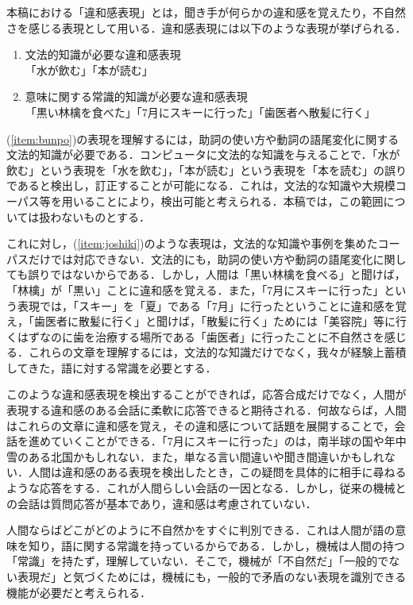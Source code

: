 \documentclass[japanese]{jnlp_1.4}
\begin{document}
本稿における「違和感表現」とは，聞き手が何らかの違和感を覚えたり，不自然さを感じる表現として用いる．違和感表現には以下のような表現が挙げられる．
	\begin{enumerate}
		\item \label{item:bunpo}  文法的知識が必要な違和感表現\\
			「水が飲む」「本が読む」
		\item \label{item:joshiki} 意味に関する常識的知識が必要な違和感表現\\
			「黒い林檎を食べた」「7月にスキーに行った」「歯医者へ散髪に行く」
	\end{enumerate} 
(\ref{item:bunpo})の表現を理解するには，助詞の使い方や動詞の語尾変化に関する文法的知識が必要である．コンピュータに文法的な知識を与えることで．「水が飲む」という表現を「水を飲む」，「本が読む」という表現を「本を読む」の誤りであると検出し，訂正することが可能になる．これは，文法的な知識や大規模コーパス等\cite{Kawahara2006}を用いることにより，検出可能と考えられる．本稿では，この範囲については扱わないものとする．

これに対し，(\ref{item:joshiki})のような表現は，文法的な知識や事例を集めたコーパスだけでは対応できない．文法的にも，助詞の使い方や動詞の語尾変化に関しても誤りではないからである．しかし，人間は「黒い林檎を食べる」と聞けば，「林檎」が「黒い」ことに違和感を覚える．また，「7月にスキーに行った」という表現では，「スキー」を「夏」である「7月」に行ったということに違和感を覚え，「歯医者に散髪に行く」と聞けば，「散髪に行く」ためには「美容院」等に行くはずなのに歯を治療する場所である「歯医者」に行ったことに不自然さを感じる．これらの文章を理解するには，文法的な知識だけでなく，我々が経験上蓄積してきた，語に対する常識を必要とする．

このような違和感表現を検出することができれば，応答合成だけでなく，人間が表現する違和感のある会話に柔軟に応答できると期待される．何故ならば，人間はこれらの文章に違和感を覚え，その違和感について話題を展開することで，会話を進めていくことができる．「7月にスキーに行った」のは，南半球の国や年中雪のある北国かもしれない．また，単なる言い間違いや聞き間違いかもしれない．人間は違和感のある表現を検出したとき，この疑問を具体的に相手に尋ねるような応答をする．これが人間らしい会話の一因となる．しかし，従来の機械との会話は質問応答が基本であり，違和感は考慮されていない．

人間ならばどこがどのように不自然かをすぐに判別できる．これは人間が語の意味を知り，語に関する常識を持っているからである．しかし，機械は人間の持つ「常識」を持たず，理解していない．そこで，機械が「不自然だ」「一般的でない表現だ」と気づくためには，機械にも，一般的で矛盾のない表現を識別できる機能が必要だと考えられる． 
\end{document}
